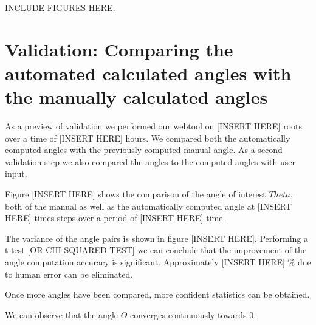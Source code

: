 INCLUDE FIGURES HERE.

\section{Validation: Comparing the automated calculated angles with the manually calculated angles}

As a preview of validation we performed our webtool on [INSERT HERE] roots over a time of [INSERT HERE] hours. We compared both the automatically computed angles with the previously computed manual angle. As a second validation step we also compared the angles to the computed angles with user input.

Figure [INSERT HERE] shows the comparison of the angle of interest \( Theta \), both of the manual as well as the automatically computed angle at [INSERT HERE] times steps over a period of [INSERT HERE] time.

The variance of the angle pairs is shown in figure [INSERT HERE]. Performing a t-test [OR CHI-SQUARED TEST] we can conclude that the improvement of the angle computation accuracy is significant. Approximately [INSERT HERE] \% due to human error can be eliminated.

Once more angles have been compared, more confident statistics can be obtained. 


We can observe that the angle \( \Theta \) converges continuously towards 0.

